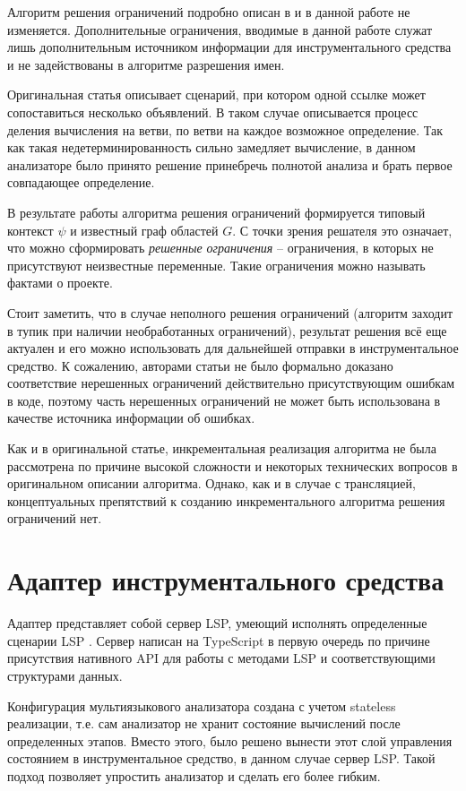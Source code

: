 Алгоритм решения ограничений подробно описан в \cite{scope-graphs-static-analysis} и в данной работе не изменяется.
Дополнительные ограничения, вводимые в данной работе служат лишь дополнительным источником информации для
инструментального средства и не задействованы в алгоритме разрешения имен.

Оригинальная статья описывает сценарий, при котором одной ссылке может сопоставиться несколько объявлений.
В таком случае описывается процесс деления вычисления на ветви, по ветви на каждое возможное определение.
Так как такая недетерминированность сильно замедляет вычисление, в данном анализаторе было принято решение
принебречь полнотой анализа и брать первое совпадающее определение.

В результате работы алгоритма решения ограничений формируется типовый контекст $\psi$ и известный граф областей
$G$. С точки зрения решателя это означает, что можно сформировать \textit{решенные ограничения} -- ограничения,
в которых не присутствуют неизвестные переменные. Такие ограничения можно называть фактами о проекте.

Стоит заметить, что в случае неполного решения ограничений (алгоритм заходит в тупик при наличии необработанных ограничений),
результат решения всё еще актуален и его можно использовать для дальнейшей отправки в инструментальное средство.
К сожалению, авторами статьи не было формально доказано соответствие нерешенных ограничений действительно присутствующим
ошибкам в коде, поэтому часть нерешенных ограничений не может быть использована в качестве источника информации об ошибках.

Как и в оригинальной статье, инкрементальная реализация алгоритма не была рассмотрена по причине высокой сложности
и некоторых технических вопросов в оригинальном описании алгоритма. Однако, как и в случае с трансляцией,
концептуальных препятствий к созданию инкрементального алгоритма решения ограничений нет.

\section{Адаптер инструментального средства}

Адаптер представляет собой сервер LSP, умеющий исполнять определенные сценарии LSP \cite{lsp-usecases}.
Сервер написан на TypeScript в первую очередь по причине присутствия нативного API для
работы с методами LSP и соответствующими структурами данных.

Конфигурация мультиязыкового анализатора создана с учетом stateless реализации, т.е. сам анализатор не хранит
состояние вычислений после определенных этапов. Вместо этого, было решено вынести этот слой управления состоянием
в инструментальное средство, в данном случае сервер LSP. Такой подход позволяет упростить анализатор и сделать его более гибким.

